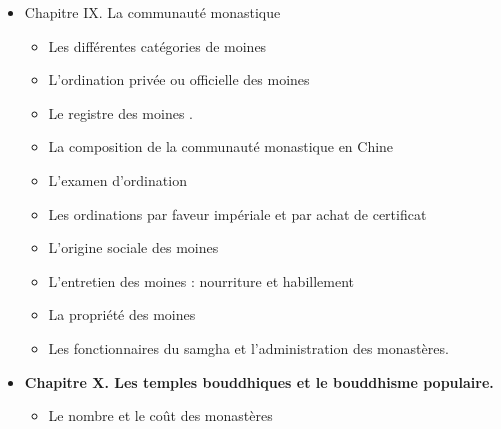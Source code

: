 \begin{itemize}
    \item Chapitre IX. La communauté monastique
    \begin{itemize}
        \item Les différentes catégories de moines
    \end{itemize}
    \begin{itemize}
        \item L'ordination privée ou officielle des moines
    \end{itemize}
    \begin{itemize}
        \item Le registre des moines .
    \end{itemize}
    \begin{itemize}
        \item La composition de la communauté monastique en Chine
    \end{itemize}
    \begin{itemize}
        \item L'examen d'ordination
    \end{itemize}
    \begin{itemize}
        \item Les ordinations par faveur impériale et par achat de certificat
    \end{itemize}
    \begin{itemize}
        \item L'origine sociale des moines
    \end{itemize}
    \begin{itemize}
        \item L'entretien des moines : nourriture et habillement
    \end{itemize}
    \begin{itemize}
        \item La propriété des moines
    \end{itemize}
    \begin{itemize}
        \item Les fonctionnaires du samgha et l'administration des monastères.
    \end{itemize}
    \item \textbf{Chapitre X. Les temples bouddhiques et le bouddhisme populaire.}
    \begin{itemize}
        \item Le nombre et le coût des monastères
    \end{itemize}
    \begin{itemize}

\end{itemize}
\end{itemize}
